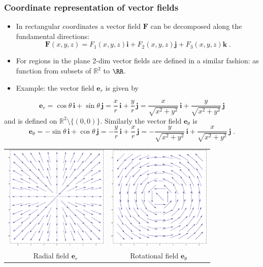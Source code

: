 \begin{frame}
\frametitle{Coordinate representation of vector fields}

\begin{itemize}
\item In rectangular coordinates a vector field $\textbf{F}$ can
be decomposed along the fundamental directions:
$$
\textbf{F}(x,y,z) = F_1(x,y,z) \textbf{i} + F_2(x,y,z) \textbf{j} + F_3(x,y,z) \textbf{k} \; .
$$
\item For regions in the plane 2-dim vector fields are defined in a similar fashion: as function from subsets of $\mathbb R^2$ to $\RR$.

\item Example: the vector field $\textbf{e}_r$ is given by

\end{itemize}
%
%
$$\textbf{e}_r = \cos\theta\, \textbf{i} +
\sin\theta \,\textbf{j} = \frac{x}{r} \, \textbf{i} +
\frac{y}{r} \, \textbf{j} = \frac{x}{\sqrt{x^2+y^2}} \,
\textbf{i} + \frac{y}{\sqrt{x^2+y^2}} \, \textbf{j}$$
%
and is defined on $\mathbb{R}^2 \setminus \{ (0,0)\}$.
Similarly the vector field $\textbf{e}_{\theta}$ is
%
$$\textbf{e}_\theta = -\sin\theta\, \textbf{i} +
\cos\theta \,\textbf{j} = -\frac{y}{r} \, \textbf{i} +
\frac{x}{r} \, \textbf{j} = -\frac{y}{\sqrt{x^2+y^2}} \,
\textbf{i} + \frac{x}{\sqrt{x^2+y^2}} \, \textbf{j} \; .$$
%
 \begin{center}
\begin{tabular}{cc}
  \includegraphics[height=5cm]{../../modules/multivariable-functions/pictures/radial_field.eps}
  &
  \includegraphics[height=5cm]{../../modules/multivariable-functions/pictures/rotational_field.eps}
  \\
  Radial field $\textbf{e}_r$ & Rotational field
  $\textbf{e}_\theta$
\end{tabular}
\end{center}


\end{frame}
